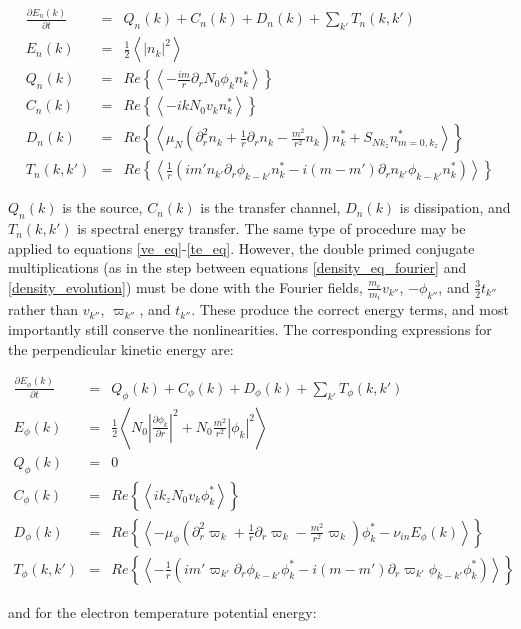\documentclass[12pt]{article}
\def\beqar{\begin{eqnarray}}
\def\eeqar{\end{eqnarray}}
\newcommand{\pdiff}[2]{\frac{\partial#1}{\partial#2}}
\newcommand{\pdr}{\partial_r}
\newcommand{\pdrr}{\partial^2_r}
\newcommand{\nuin}{\nu_{in}}
\newcommand{\fmei}{\frac{m_e}{m_i}}
\begin{document}
\beqar
\label{Fourier_density_evolution}
\pdiff{E_n(k)}{t} & = & Q_n(k) + C_n(k) + D_n(k) + \sum_{k'} T_n(k,k') \\
E_n(k) & = & \frac{1}{2} \left< |n_k|^2 \right> \\
Q_n(k) & = & Re \left\{ \left< -\frac{i m}{r} \pdr N_0 \phi_k n_k^* \right> \right\} \\
C_n(k) & = & Re \left\{ \left< - i k N_0 v_k n_k^* \right> \right\} \\
D_n(k) & = & Re \left\{ \left<  \mu_N( \pdrr n_k + \frac{1}{r} \pdr n_k - \frac{m^2}{r^2} n_k) n_k^*  + S_{N k_z} n_{m=0,k_z}^*  \right> \right\} \\
T_n(k,k') & = & Re \left\{ \left< \frac{1}{r} \left( i m' n_{k'} \pdr \phi_{k-k'} n_k^*  - i (m - m') \pdr n_{k'} \phi_{k-k'} n_k^*        \right) \right> \right\}
\eeqar

$Q_n(k)$ is the source, $C_n(k)$ is the transfer channel, $D_n(k)$ is dissipation, and $T_n(k,k')$ is spectral energy transfer.
The same type of procedure may be applied to equations \ref{ve_eq}-\ref{te_eq}. 
However, the double primed conjugate multiplications (as in the step between equations \ref{density_eq_fourier} and 
\ref{density_evolution}) must be done with the Fourier fields, $\fmei v_{k''}$,  $- \phi_{k''}$, and $\frac{3}{2} t_{k''}$ rather than 
$v_{k''}$, $\varpi_{k''}$, and $t_{k''}$.
These produce the correct energy terms, and most importantly still conserve the nonlinearities. The corresponding expressions for the perpendicular kinetic energy are:

\beqar
\label{Fourier_phi_evolution}
\pdiff{E_\phi(k)}{t} & = & Q_\phi(k) + C_\phi(k) + D_\phi(k) + \sum_{k'} T_\phi(k,k') \\
E_\phi(k) & = & \frac{1}{2} \left<  N_0 \left| \pdiff{\phi_k}{r} \right|^2 + N_0 \frac{m^2}{r^2} |\phi_k|^2  \right>\\
Q_\phi(k) & = & 0 \\
C_\phi(k) & = & Re \left\{ \left< i k_z N_0 v_k \phi_k^* \right> \right\} \\
D_\phi(k) & = & Re \left\{ \left<  - \mu_\phi( \pdrr \varpi_k + \frac{1}{r} \pdr \varpi_k - \frac{m^2}{r^2} \varpi_k) \phi_k^* -  \nuin E_\phi(k)\right> \right\} \\
T_\phi(k,k') & = & Re \left\{ \left< - \frac{1}{r} \left( i m' \varpi_{k'} \pdr \phi_{k-k'} \phi_k^*  - i (m - m') \pdr \varpi_{k'} \phi_{k-k'} \phi_k^*        \right) \right> \right\}
\eeqar

and for the electron temperature potential energy:
\end{document}
